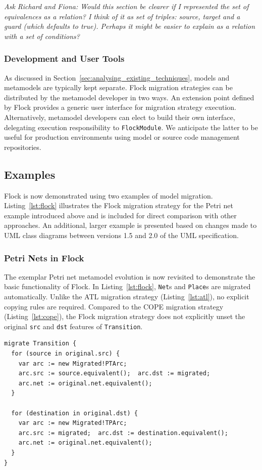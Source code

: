 \emph{Ask Richard and Fiona: Would this section be clearer if I represented the set of equivalences as a relation? I think of it as set of triples: source, target and a guard (which defaults to true). Perhaps it might be easier to explain as a relation with a set of conditions?}
 
\subsubsection{Development and User Tools}
As discussed in Section~\ref{sec:analysing_existing_techniques}, models and metamodels are typically kept separate. Flock migration strategies can be distributed by the metamodel developer in two ways. An extension point defined by Flock provides a generic user interface for migration strategy execution. Alternatively, metamodel developers can elect to build their own interface, delegating execution responsibility to \texttt{FlockModule}. We anticipate the latter to be useful for production environments using model or source code management repositories.


\subsection{Examples}
\label{subsec:flock_examples}
Flock is now demonstrated using two examples of model migration. Listing~\ref{lst:flock} illustrates the Flock migration strategy for the Petri net example introduced above and is included for direct comparison with other approaches. An additional, larger example is presented based on changes made to UML class diagrams between versions 1.5 and 2.0 of the UML specification.

\subsubsection{Petri Nets in Flock}
The exemplar Petri net metamodel evolution is now revisited to demonstrate the basic functionality of Flock. In Listing~\ref{lst:flock}, \texttt{Net}s and \texttt{Place}s are migrated automatically. Unlike the ATL migration strategy (Listing~\ref{lst:atl}), no explicit copying rules are required. Compared to the COPE migration strategy (Listing~\ref{lst:cope}), the Flock migration strategy does not explicitly unset the original \texttt{src} and \texttt{dst} features of \texttt{Transition}.

\begin{lstlisting}[caption=Petri nets model migration in Flock, label=lst:flock, language=Flock]
migrate Transition {
  for (source in original.src) {
    var arc := new Migrated!PTArc;
    arc.src := source.equivalent();  arc.dst := migrated;
    arc.net := original.net.equivalent();
  }

  for (destination in original.dst) {
    var arc := new Migrated!TPArc;
    arc.src := migrated;  arc.dst := destination.equivalent();
    arc.net := original.net.equivalent();
  }
}
\end{lstlisting}

